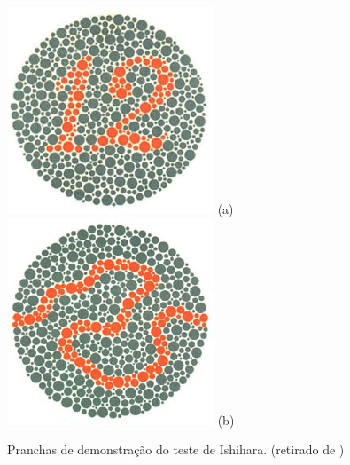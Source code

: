 \documentclass[	12pt, Times, openright, twoside, a4paper, english, brazil]{abntex2}
\begin{document}
\begin{apendicesenv}
\begin{figure}[!htb]
\centering
{\includegraphics[width=\linewidth]{ishihara-exemplos/plate1.jpg}}
(a)
\endminipage\hfill
{}
\centering
{\includegraphics[width=\linewidth]{ishihara-exemplos/plate38.jpg}}
(b)
\endminipage\hfill
\caption{Pranchas de demonstração do teste de Ishihara. (retirado de )}
\label{fig:apendiceExample}
\end{figure}


\end{apendicesenv}
\end{document}
